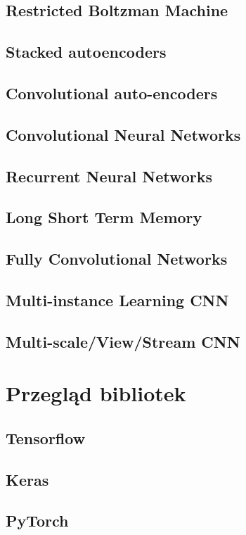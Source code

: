 \documentclass[a4paper,twoside,titlepage,openright]{book}
\begin{document}
\subsection{Restricted Boltzman Machine}
\subsection{Stacked autoencoders}
\subsection{Convolutional auto-encoders}
\subsection{Convolutional Neural Networks}
\subsection{Recurrent Neural Networks}
\subsection{Long Short Term Memory}
\subsection{Fully Convolutional Networks}
\subsection{Multi-instance Learning CNN}
\subsection{Multi-scale/View/Stream CNN}

\section{Przegląd bibliotek}
\subsection{Tensorflow}

\subsection{Keras}
\subsection{PyTorch}
\end{document}
